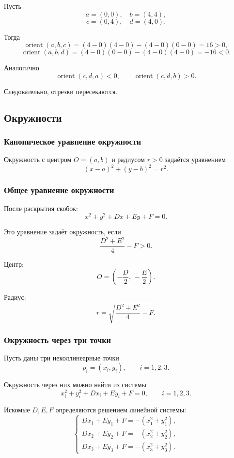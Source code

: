 \documentclass[12pt,a4paper]{article}
\begin{document}
Пусть
\[
a=(0,0),\quad b=(4,4),
\]
\[
c=(0,4),\quad d=(4,0).
\]

Тогда
\[
\operatorname{orient}(a,b,c)
=
(4-0)(4-0)-(4-0)(0-0)=16>0,
\]
\[
\operatorname{orient}(a,b,d)
=
(4-0)(0-0)-(4-0)(4-0)=-16<0.
\]

Аналогично
\[
\operatorname{orient}(c,d,a)<0,
\qquad
\operatorname{orient}(c,d,b)>0.
\]

Следовательно, отрезки пересекаются.

\subsection{Окружности}

\subsubsection{Каноническое уравнение окружности}

Окружность с центром \(O=(a,b)\) и радиусом \(r>0\) задаётся уравнением
\[
(x-a)^2+(y-b)^2=r^2.
\]

\subsubsection{Общее уравнение окружности}

После раскрытия скобок:
\[
x^2+y^2+Dx+Ey+F=0.
\]

Это уравнение задаёт окружность, если
\[
\frac{D^2+E^2}{4}-F>0.
\]

Центр:
\[
O=
\left(
-\frac D2,\,
-\frac E2
\right).
\]

Радиус:
\[
r=
\sqrt{
\frac{D^2+E^2}{4}-F
}.
\]

\subsubsection{Окружность через три точки}

Пусть даны три неколлинеарные точки
\[
p_i=(x_i,y_i),\qquad i=1,2,3.
\]

Окружность через них можно найти из системы
\[
x_i^2+y_i^2+Dx_i+Ey_i+F=0,
\qquad i=1,2,3.
\]

Искомые \(D,E,F\) определяются решением линейной системы:
\[
\begin{cases}
D x_1+E y_1+F=-(x_1^2+y_1^2),\\
D x_2+E y_2+F=-(x_2^2+y_2^2),\\
D x_3+E y_3+F=-(x_3^2+y_3^2).
\end{cases}
\]
\end{document}
